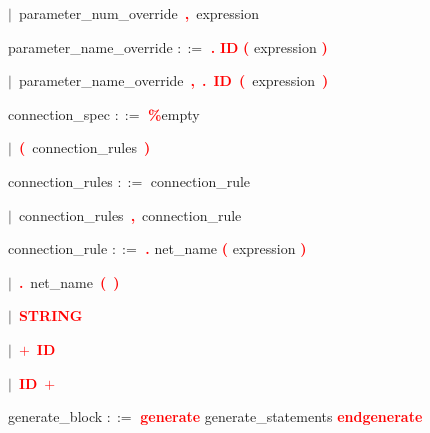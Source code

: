 \mbox{$|$ parameter\_num\_override \textbf{\textcolor{red}{,}} expression}

\vspace{1em}
\noindent
\settowidth{\parindent}{\hspace{4ex}}
parameter\_name\_override $::=$\hspace{1ex} \textbf{\textcolor{red}{.}} \textbf{\textcolor{red}{ID}} \textbf{\textcolor{red}{(}} expression \textbf{\textcolor{red}{)}}

\mbox{$|$ parameter\_name\_override \textbf{\textcolor{red}{,}} \textbf{\textcolor{red}{.}} \textbf{\textcolor{red}{ID}} \textbf{\textcolor{red}{(}} expression \textbf{\textcolor{red}{)}}}

\vspace{1em}
\noindent
\settowidth{\parindent}{\hspace{4ex}}
connection\_spec $::=$\hspace{1ex} \textbf{\textcolor{red}{\%}}empty

\mbox{$|$ \textbf{\textcolor{red}{(}} connection\_rules \textbf{\textcolor{red}{)}}}

\vspace{1em}
\noindent
\settowidth{\parindent}{\hspace{4ex}}
connection\_rules $::=$\hspace{1ex} connection\_rule

\mbox{$|$ connection\_rules \textbf{\textcolor{red}{,}} connection\_rule}

\vspace{1em}
\noindent
\settowidth{\parindent}{\hspace{4ex}}
connection\_rule $::=$\hspace{1ex} \textbf{\textcolor{red}{.}} net\_name \textbf{\textcolor{red}{(}} expression \textbf{\textcolor{red}{)}}

\mbox{$|$ \textbf{\textcolor{red}{.}} net\_name \textbf{\textcolor{red}{(}} \textbf{\textcolor{red}{)}}}

\mbox{$|$ \textbf{\textcolor{red}{STRING}}}

\mbox{$|$ \textbf{\textcolor{red}{$+$}} \textbf{\textcolor{red}{ID}}}

\mbox{$|$ \textbf{\textcolor{red}{ID}} \textbf{\textcolor{red}{$+$}}}

\vspace{1em}
\noindent
\settowidth{\parindent}{\hspace{4ex}}
generate\_block $::=$\hspace{1ex} \textbf{\textcolor{red}{generate}} generate\_statements \textbf{\textcolor{red}{endgenerate}}

